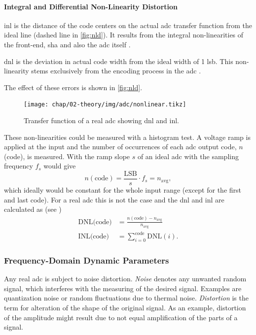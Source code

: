 \paragraph{Integral and Differential Non-Linearity Distortion} 
\gls{inl} is the distance of the code centers on the actual \gls{adc} transfer function from the ideal line (dashed line in \autoref{fig:nld}). 
It results from the integral non-linearities of the front-end, \gls{sha} and also the \gls{adc} itself \cite{walt, Lundberg}. 

\gls{dnl} is the deviation in actual code width from the ideal width of 1 \gls{lsb}. This non-linearity stems exclusively from the encoding process in the \gls{adc} \cite{Lundberg,walt} . 

The effect of these errors is shown in \autoref{fig:nld}.
\begin{figure}[tb]
	\centering
	\texttt{[image: chap/02-theory/img/adc/nonlinear.tikz]}
	\caption[ADC Nonlinearities]{Transfer function of a real \gls{adc} showing \gls{dnl} and \gls{inl}.\cite{Lundberg}}
	\label{fig:nld}
\end{figure}

These non-linearities could be measured with a histogram test.
A voltage ramp is applied at the input and the number of occurrences of each \gls{adc} output code, $n$(code), is measured.
With the ramp slope $s$ of an ideal \gls{adc} with the sampling frequency $f_s$ would give
\begin{equation}
	n(\text{code}) = \frac{\text{LSB}}{s} \cdot f_s = n_\text{avg},
\end{equation}
which ideally would be constant for the whole input range (except for the first and last code).
For a real \gls{adc} this is not the case and the \gls{dnl} and \gls{inl} are calculated as (see \cite{inlDnl})
\begin{align}
	\text{DNL(code)} &= \frac{n(\text{code})-n_\text{avg}}{n_\text{avg}}\\
	\text{INL(code)} &= \sum_{i = 0}^{\text{code}} \text{DNL}(i).
\end{align}


\subsubsection{Frequency-Domain Dynamic Parameters}
Any real \gls{adc} is subject to noise distortion. 
\textit{Noise} denotes any unwanted random signal, which interferes with the measuring of the desired signal. 
Examples are quantization noise or random fluctuations due to thermal noise. 
\textit{Distortion} is the term for alteration of the shape of the original signal. 
As an example, distortion of the amplitude might result due to not equal amplification of the parts of a signal. \cite{nd}

